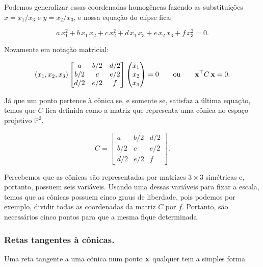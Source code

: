 Podemos generalizar essas coordenadas homogêneas fazendo as substituições $x = x_{1}/x_{3}$ e $y = x_{2}/x_{3}$, e nossa equação do elípse fica:

\begin{equation*}
a\,x_1^2+b\,x_1\,x_2+c\,x_2^2+d\,x_1\,x_3+e\,x_2\,x_3+f\,x_3^2=0.
\end{equation*}

Novamente em notação matricial:

\begin{equation*}
(x_1,x_2,x_3) 
 \begin{bmatrix}
  a & b/2 & d/2\\
  b/2 & c & e/2\\
  d/2 & e/2 & f
  \end{bmatrix}
 \begin{pmatrix}
  x_1\\
  x_2\\
  x_3
  \end{pmatrix}
 = 0
 \qquad \text{ou} \qquad
 \mathbf{x}^\top C\,\mathbf{x} = 0.
\end{equation*}

Já que um ponto pertence à cônica se, e somente se, satisfaz a última equação, temos que $C$ fica definida como a matriz que representa uma cônica no espaço projetivo $\mathbb{P}^2$.

\begin{equation*}
C =  \begin{bmatrix}
      a & b/2 & d/2\\
      b/2 & c & e/2\\
      d/2 & e/2 & f
      \end{bmatrix}.
\end{equation*}

Percebemos que as cônicas são representadas por matrizes $3\times3$ simétricas e, portanto, possuem seis variáveis. Usando uma dessas variáveis para fixar a escala, temos que as cônicas possuem cinco graus de liberdade, pois podemos por exemplo, dividir todas as coordenadas da matriz $C$ por $f$. Portanto, são necessários cinco pontos para que a mesma fique determinada.  \\

\subsubsection{Retas tangentes à cônicas.} 

Uma reta tangente a uma cônica num ponto $\mathbf{x}$ qualquer tem a simples forma

